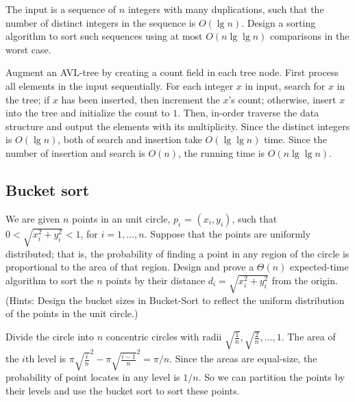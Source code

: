 \begin{Exercise}[origin={NCU CSIE 98}]
The input is a sequence of $n$ integers with many duplications, such that the number of distinct integers in the sequence is $O(\lg n)$.
Design a sorting algorithm to sort such sequences using at most $O(n \lg \lg n)$ comparisons in the worst case.
\end{Exercise}
\begin{Answer}
Augment an AVL-tree by creating a count field in each tree node. First process all elements in the input sequentially. For each integer $x$ in input, search for $x$ in the tree; if $x$ has been inserted, then increment the $x$'s count; otherwise, insert $x$ into the tree and initialize the count to $1$. Then, in-order traverse the data structure and output the elements with its multiplicity. Since the distinct integers is $O(\lg n)$, both of search and insertion take $O(\lg \lg n)$ time. Since the number of insertion and search is $O(n)$, the running time is $O(n \lg \lg n)$.
\end{Answer}

\subsection{Bucket sort}
\begin{Exercise}[origin={NDHU CSIE 97}]
We are given $n$ points in an unit circle, $ p_i$ = $(x_i, y_i)$, such that $0 < \sqrt{x_i^2 + y_i^2} < 1$, for $i = 1, \dots, n$. Suppose that the points are uniformly distributed; that is, the probability of finding a point in any region of the circle is proportional to the area of that region. Design and prove a $\Theta(n)$ expected-time algorithm to sort the $n$ points by their distance $d_i = \sqrt{x_i^2 + y_i^2}$ from the origin. (Hints: Design the bucket sizes in Bucket-Sort to reflect the uniform distribution of the points in the unit circle.)
\end{Exercise}
\begin{Answer}
Divide the circle into $n$ concentric circles with radii $\sqrt{\frac{1}{n}}, \sqrt{\frac{2}{n}}, \dots, 1$. The area of the $i$th level is $\pi {\sqrt{\frac{i}{n}}}^2 - \pi {\sqrt{\frac{i-1}{n}}}^2 = \pi/n$. Since the areas are equal-size, the probability of point locates in any level is $1/n$. So we can partition the points by their levels and use the bucket sort to sort these points.
\end{Answer}

